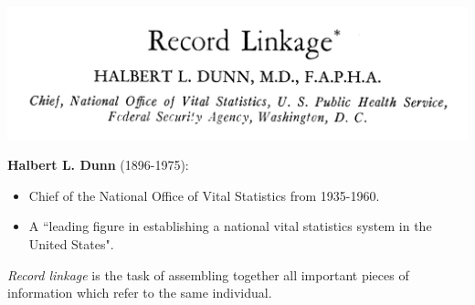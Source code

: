 \documentclass[compress]{beamer}
\newcommand{\1}[1]{\mathbb{I}\!\left[#1\right]} %
\theoremstyle{plain}
\begin{document}
%
%


\begin{frame}
    
\begin{center}
    \includegraphics[width=0.8\linewidth]{finalFigures/Dunn-0}
\end{center}

\textbf{Halbert L. Dunn} (1896-1975):

\begin{itemize}
    \item Chief of the National Office of Vital Statistics from 1935-1960.
    \item A ``leading figure in establishing a national vital statistics system in the United States".
\end{itemize}

    
\end{frame}

\begin{frame}


\emph{Record linkage} is the task of assembling together all important pieces of information which refer to the same individual.

%

\end{frame}
\end{document}

